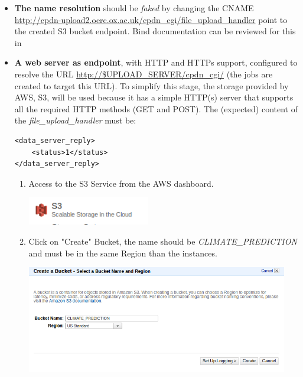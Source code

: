 \documentclass[journal abbreviation, manuscript]{copernicus}
\begin{document}
\begin{itemize}
 \item \textbf{The name resolution} should be \textit{faked} by changing the CNAME \url{http://cpdn-upload2.oerc.ox.ac.uk/cpdn_cgi/file_upload_handler} point to the created S3 bucket endpoint. Bind documentation can be reviewed for this in~\cite{bind2010}

\item \textbf{A web server as endpoint}, with HTTP and HTTPs support, configured to resolve the URL \url{http://$UPLOAD_SERVER/cpdn_cgi/} (the jobs are created to target this URL). To simplify this stage, the storage provided by AWS, S3, will be used because it has a simple HTTP(s) server that supports all the required HTTP methods (GET and POST). The (expected) content of the \textit{file\_upload\_handler} must be:

\begin{verbatim}
<data_server_reply>
    <status>1</status>
</data_server_reply>
\end{verbatim}

\begin{enumerate}
\item Access to the S3 Service from the AWS dashboard.
\begin{center}
  \includegraphics[width=2.1in]{images/screenshots/storage/storage01.png}
\end{center}

\item Click on "Create" Bucket, the name should be \textit{CLIMATE\_PREDICTION} and must be in the same Region than the instances.
\begin{center}
  \includegraphics[width=4.5in]{images/screenshots/storage/storage02.png}
\end{center}


\end{enumerate}
\end{itemize}
\end{document}
